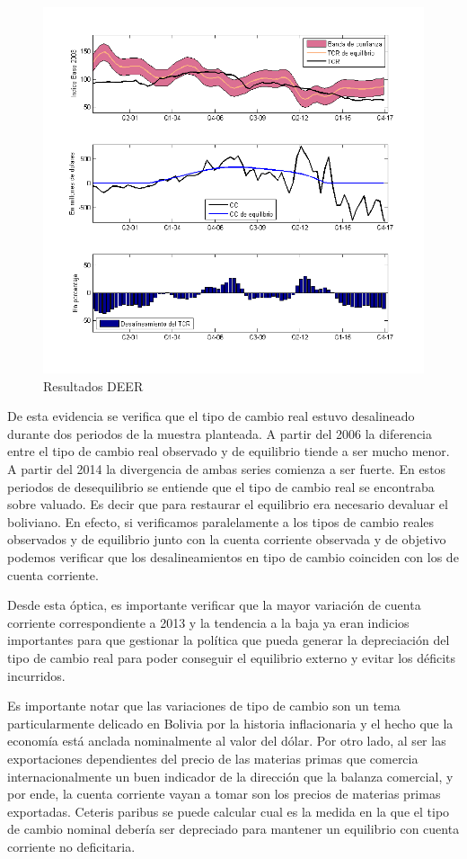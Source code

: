 \documentclass[12pt,letterpaper]{article}
\begin{document}
\begin{figure}
\caption{Resultados DEER}
\centering
\includegraphics[scale=0.75]{tcreq}
\end{figure}

De esta evidencia se verifica que el tipo de cambio real estuvo desalineado durante dos periodos de la muestra planteada. A partir del 2006 la diferencia entre el tipo de cambio real observado y de equilibrio tiende a ser mucho menor. A partir del 2014 la divergencia de ambas series comienza a ser fuerte. En estos periodos de desequilibrio se entiende que el tipo de cambio real se encontraba sobre valuado. Es decir que para restaurar el equilibrio era necesario devaluar el boliviano. En efecto, si verificamos paralelamente a los tipos de cambio reales observados y de equilibrio junto con la cuenta corriente observada y de objetivo podemos verificar que los desalineamientos en tipo de cambio coinciden con los de cuenta corriente. 

Desde esta óptica, es importante verificar que la mayor variación de cuenta corriente correspondiente a 2013 y la tendencia a la baja ya eran indicios importantes para que gestionar la política que pueda generar la depreciación del tipo de cambio real para poder conseguir el equilibrio externo y evitar los déficits incurridos.

Es importante notar que las variaciones de tipo de cambio son un tema particularmente delicado en Bolivia por la historia inflacionaria y el hecho que la economía está anclada nominalmente al valor del dólar. Por otro lado, al ser las exportaciones dependientes del precio de las materias primas que comercia internacionalmente un buen indicador de la dirección que la balanza comercial, y por ende, la cuenta corriente vayan a tomar son los precios de materias primas exportadas. Ceteris paribus se puede calcular cual es la medida en la que el tipo de cambio nominal debería ser depreciado para mantener un equilibrio con cuenta corriente no deficitaria.
\end{document}
